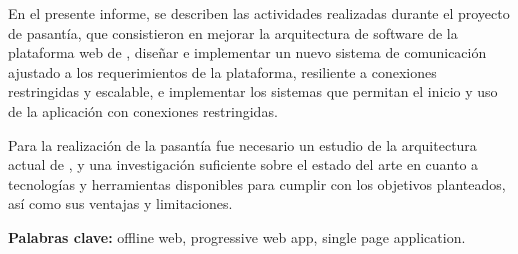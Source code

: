 {En el presente informe, se describen las actividades realizadas durante el proyecto de pasantía, que consistieron en mejorar la arquitectura de software de la plataforma web de \business, diseñar e implementar un nuevo sistema de comunicación ajustado a los requerimientos de la plataforma, resiliente a conexiones restringidas y escalable, e implementar los sistemas que permitan el inicio y uso de la aplicación con conexiones restringidas.

Para la realización de la pasantía fue necesario un estudio de la arquitectura actual de \business, y una investigación suficiente sobre el estado del arte en cuanto a tecnologías y herramientas disponibles para cumplir con los objetivos planteados, así como sus ventajas y limitaciones.

\textbf{Palabras clave:} offline web, progressive web app, single page application.

}

\newpage
